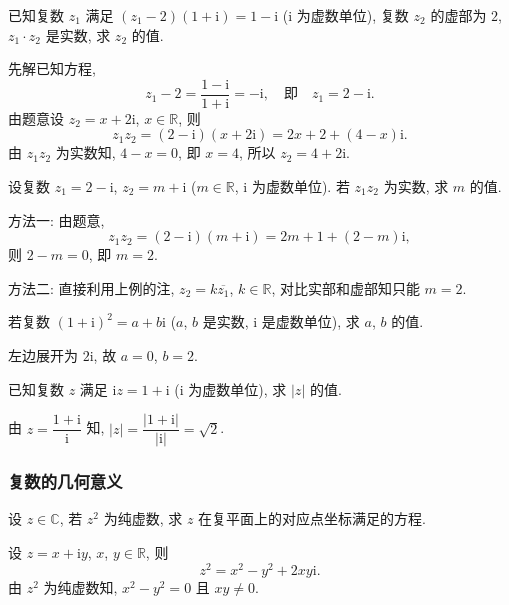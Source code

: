 \begin{example}
    已知复数 $z_1$ 满足 $(z_1-2)(1+\mathrm{i})=1-\mathrm{i}$ ($\mathrm{i}$ 为虚数单位), 复数 $z_2$ 的虚部为 $2$, $z_1\cdot z_2$ 是实数, 求 $z_2$ 的值.
\end{example}
\beginsolution
    先解已知方程,
    \[z_1-2= \frac{1-\mathrm{i}}{1+\mathrm{i}}= -\mathrm{i},
        \quad\text{即}\quad z_1= 2-\mathrm{i}.\]
    由题意设 $z_2= x+2\mathrm{i}$, $x\in\mathbb{R}$, 则
    \[z_1z_2= (2-\mathrm{i})(x+2\mathrm{i})
        = 2x+2+ (4-x)\mathrm{i}.\]
    由 $z_1z_2$ 为实数知, $4-x=0$, 即 $x=4$, 所以 $z_2= 4+2\mathrm{i}$.
\endsolution

\lianxi
\begin{exercise}
    设复数 $z_1 =2-\mathrm{i}$, $z_2= m+\mathrm{i}$ ($m\in\mathbb{R}$, $\mathrm{i}$ 为虚数单位). 若 $z_1z_2$ 为实数, 求 $m$ 的值.
\end{exercise}
\beginsolution
    方法一: 由题意, 
    \[z_1z_2= (2-\mathrm{i})(m+\mathrm{i})
        = 2m+1+ (2-m)\mathrm{i},\]
    则 $2-m=0$, 即 $m=2$.

    方法二: 直接利用上例的注, $z_2= k\overline{z_1}$, $k\in\mathbb{R}$, 对比实部和虚部知只能 $m=2$.
\endsolution

\begin{exercise}
    若复数 $(1+\mathrm{i})^2 =a+b\mathrm{i}$ ($a$, $b$ 是实数, $\mathrm{i}$ 是虚数单位), 求 $a$, $b$ 的值.
\end{exercise}
\beginsolution
    左边展开为 $2\mathrm{i}$, 故 $a=0$, $b=2$.
\endsolution

\begin{exercise}
    已知复数 $z$ 满足 $\mathrm{i}z= 1+\mathrm{i}$ ($\mathrm{i}$ 为虚数单位), 求 $|z|$ 的值.
\end{exercise}
\beginsolution
    由 $z= \dfrac{1+\mathrm{i}}{\mathrm{i}}$ 知, $|z|= \dfrac{|1+\mathrm{i}|}{|\mathrm{i}|}= \sqrt2$.
\endsolution

\subsubsection{复数的几何意义}
\begin{example}
    设 $z\in\mathbb{C}$, 若 $z^2$ 为纯虚数, 求 $z$ 在复平面上的对应点坐标满足的方程.
\end{example}
\beginsolution
    设 $z= x+\mathrm{i}y$, $x$, $y\in\mathbb{R}$, 则
    \[z^2= x^2-y^2+ 2xy\mathrm{i}.\]
    由 $z^2$ 为纯虚数知, $x^2-y^2=0$ 且 $xy\neq 0$.
\endsolution

